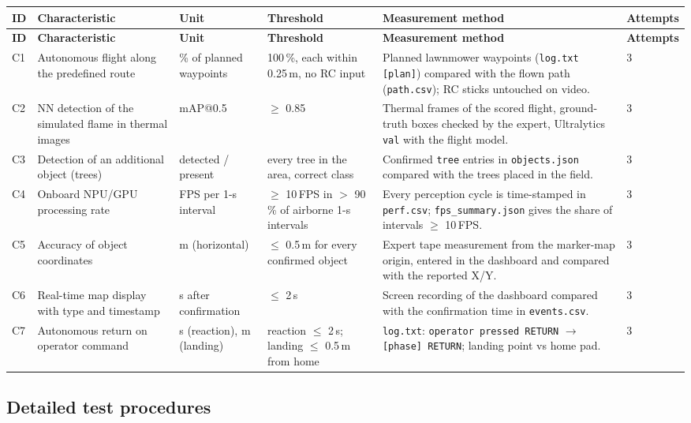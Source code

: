 \documentclass[10pt,a4paper]{article}
\newcommand{\head}[1]{\textbf{#1}}
\newcommand{\file}[1]{\texttt{\small #1}}
\begin{document}
\begin{longtable}{|L{0.6cm}|L{3.1cm}|L{1.7cm}|L{2.3cm}|L{5.6cm}|L{1.2cm}|}
\hline
{}\head{ID} & \head{Characteristic} & \head{Unit} & \head{Threshold} & \head{Measurement method} & \head{Attempts} \\ \hline
\endfirsthead
\hline
{}\head{ID} & \head{Characteristic} & \head{Unit} & \head{Threshold} & \head{Measurement method} & \head{Attempts} \\ \hline
\endhead
C1 & Autonomous flight along the predefined route & \% of planned waypoints & 100\,\%, each within 0.25\,m, no RC input & Planned lawnmower waypoints (\file{log.txt} \texttt{[plan]}) compared with the flown path (\file{path.csv}); RC sticks untouched on video. & 3 \\ \hline
C2 & NN detection of the simulated flame in thermal images & mAP@0.5 & $\ge$ 0.85 & Thermal frames of the scored flight, ground-truth boxes checked by the expert, Ultralytics \texttt{val} with the flight model. & 3 \\ \hline
C3 & Detection of an additional object (trees) & detected / present & every tree in the area, correct class & Confirmed \texttt{tree} entries in \file{objects.json} compared with the trees placed in the field. & 3 \\ \hline
C4 & Onboard NPU/GPU processing rate & FPS per 1-s interval & $\ge$ 10\,FPS in $>$ 90\,\% of airborne 1-s intervals & Every perception cycle is time-stamped in \file{perf.csv}; \file{fps\_summary.json} gives the share of intervals $\ge$ 10\,FPS. & 3 \\ \hline
C5 & Accuracy of object coordinates & m (horizontal) & $\le$ 0.5\,m for every confirmed object & Expert tape measurement from the marker-map origin, entered in the dashboard and compared with the reported X/Y. & 3 \\ \hline
C6 & Real-time map display with type and timestamp & s after confirmation & $\le$ 2\,s & Screen recording of the dashboard compared with the confirmation time in \file{events.csv}. & 3 \\ \hline
C7 & Autonomous return on operator command & s (reaction), m (landing) & reaction $\le$ 2\,s; landing $\le$ 0.5\,m from home & \file{log.txt}: \texttt{operator pressed RETURN} $\rightarrow$ \texttt{[phase] RETURN}; landing point vs home pad. & 3 \\ \hline
\end{longtable}

\subsection{Detailed test procedures}
\end{document}
